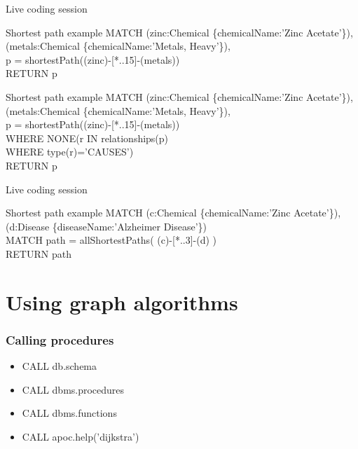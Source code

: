 \documentclass[12pt]{beamer}
\begin{document}
    \begin{frame}{Live coding session}
        \begin{block}{Shortest path example}
            MATCH (zinc:Chemical \{chemicalName:'Zinc Acetate'\}),\\
            \hspace{1cm} (metals:Chemical \{chemicalName:'Metals, Heavy'\}),\\
            \hspace{1cm} p = shortestPath((zinc)-[*..15]-(metals))\\
            RETURN p\\
        \end{block}
        \begin{block}{Shortest path example}
            MATCH (zinc:Chemical \{chemicalName:'Zinc Acetate'\}),\\
            \hspace{1cm} (metals:Chemical \{chemicalName:'Metals, Heavy'\}),\\
            \hspace{1cm} p = shortestPath((zinc)-[*..15]-(metals))\\
            WHERE NONE(r IN relationships(p)\\
            \hspace{2.7cm} WHERE type(r)='CAUSES')\\
            RETURN p\\
        \end{block}
    \end{frame}
    
    \begin{frame}{Live coding session}
        \begin{block}{Shortest path example}
            MATCH (c:Chemical \{chemicalName:'Zinc Acetate'\}),\\
            \hspace{1cm} (d:Disease \{diseaseName:'Alzheimer Disease'\})\\
            MATCH path = allShortestPaths( (c)-[*..3]-(d) )\\
            RETURN path
        \end{block}
    \end{frame}
    
    \section{Using graph algorithms}
    \begin{frame}
        \frametitle{Calling procedures}
        \begin{itemize}
            \item CALL db.schema
            \item CALL dbms.procedures
            \item CALL dbms.functions
            \item CALL apoc.help('dijkstra')
        \end{itemize}
    \end{frame}
    
\end{document}
